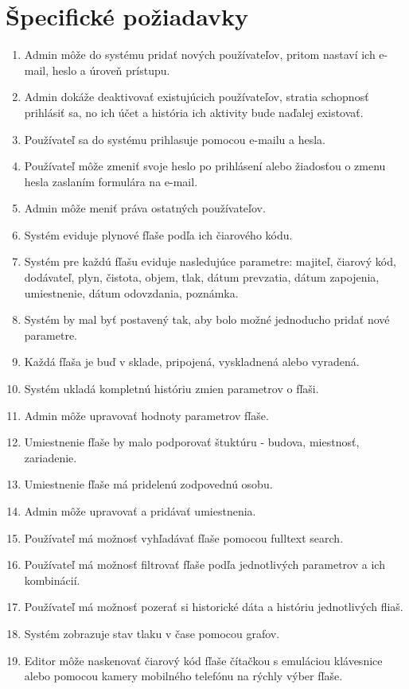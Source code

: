 \documentclass[hreffootnote]{zah}
\begin{document}
\cleardoublepage
\section{Špecifické požiadavky}

\begin{enumerate}
\item Admin môže do systému pridať nových používateľov, pritom nastaví ich e-mail, heslo a úroveň prístupu.
\item Admin dokáže deaktivovať existujúcich používateľov, stratia schopnosť prihlásiť sa, no ich účet a história ich aktivity bude naďalej existovať.
\item Používateľ sa do systému prihlasuje pomocou e-mailu a hesla.
\item Používateľ môže zmeniť svoje heslo po prihlásení alebo žiadosťou o zmenu hesla zaslaním formulára na e-mail.
\item Admin môže meniť práva ostatných používateľov.
\item Systém eviduje plynové fľaše podľa ich čiarového kódu.
\item Systém pre každú fľašu eviduje nasledujúce parametre: majiteľ, čiarový kód, dodávateľ, plyn, čistota, objem, tlak, dátum prevzatia, dátum zapojenia, umiestnenie, dátum odovzdania, poznámka.
\item Systém by mal byť postavený tak, aby bolo možné jednoducho pridať nové parametre.
\item Každá fľaša je buď v sklade, pripojená, vyskladnená alebo vyradená.
\item Systém ukladá kompletnú históriu zmien parametrov o fľaši.
\item Admin môže upravovať hodnoty parametrov fľaše.
\item Umiestnenie fľaše by malo podporovať štuktúru - budova, miestnosť, zariadenie.
\item Umiestnenie fľaše má pridelenú zodpovednú osobu.
\item Admin môže upravovať a pridávať umiestnenia.
\item Používateľ má možnosť vyhľadávať fľaše pomocou fulltext search.
\item Používateľ má možnosť filtrovať fľaše podľa jednotlivých parametrov a ich kombinácií.
\item Používateľ má možnosť pozerať si historické dáta a históriu jednotlivých fliaš.
\item Systém zobrazuje stav tlaku v čase pomocou grafov.
\item Editor môže naskenovať čiarový kód fľaše čítačkou s emuláciou klávesnice alebo pomocou kamery mobilného telefónu na rýchly výber fľaše.


\end{enumerate}
\end{document}
